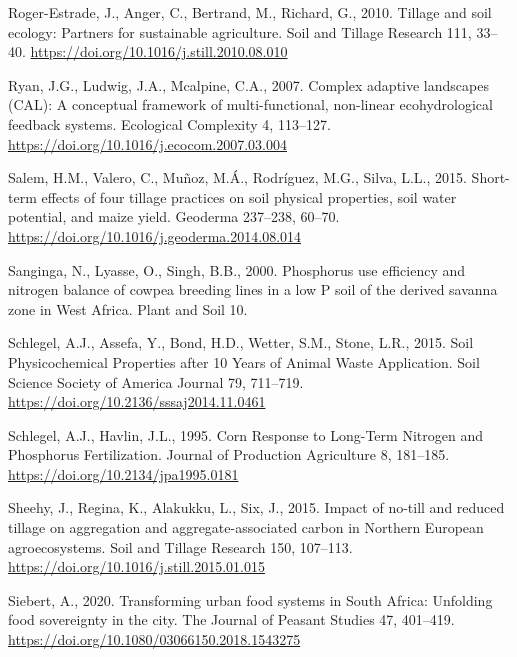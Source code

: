 \documentclass[
  12pt,
]{article}
\newlength{\cslhangindent}
\newlength{\cslentryspacingunit} %
\newenvironment{CSLReferences}[2] %
 {%
  \setlength{\parindent}{0pt}
  \ifodd #1
  \let\oldpar\par
  \def\par{\hangindent=\cslhangindent\oldpar}
  \fi
  \setlength{\parskip}{#2\cslentryspacingunit}
 }%
 {}
\begin{document}
\begin{CSLReferences}{1}{0}
\leavevmode{}%
Roger-Estrade, J., Anger, C., Bertrand, M., Richard, G., 2010. Tillage and soil ecology: {Partners} for sustainable agriculture. Soil and Tillage Research 111, 33--40. \url{https://doi.org/10.1016/j.still.2010.08.010}

\leavevmode{}%
Ryan, J.G., Ludwig, J.A., Mcalpine, C.A., 2007. Complex adaptive landscapes ({CAL}): {A} conceptual framework of multi-functional, non-linear ecohydrological feedback systems. Ecological Complexity 4, 113--127. \url{https://doi.org/10.1016/j.ecocom.2007.03.004}

\leavevmode{}%
Salem, H.M., Valero, C., Muñoz, M.Á., Rodríguez, M.G., Silva, L.L., 2015. Short-term effects of four tillage practices on soil physical properties, soil water potential, and maize yield. Geoderma 237--238, 60--70. \url{https://doi.org/10.1016/j.geoderma.2014.08.014}

\leavevmode{}%
Sanginga, N., Lyasse, O., Singh, B.B., 2000. Phosphorus use efficiency and nitrogen balance of cowpea breeding lines in a low {P} soil of the derived savanna zone in {West Africa}. Plant and Soil 10.

\leavevmode{}%
Schlegel, A.J., Assefa, Y., Bond, H.D., Wetter, S.M., Stone, L.R., 2015. Soil {Physicochemical Properties} after 10 {Years} of {Animal Waste Application}. Soil Science Society of America Journal 79, 711--719. \url{https://doi.org/10.2136/sssaj2014.11.0461}

\leavevmode{}%
Schlegel, A.J., Havlin, J.L., 1995. Corn {Response} to {Long-Term Nitrogen} and {Phosphorus Fertilization}. Journal of Production Agriculture 8, 181--185. \url{https://doi.org/10.2134/jpa1995.0181}

\leavevmode{}%
Sheehy, J., Regina, K., Alakukku, L., Six, J., 2015. Impact of no-till and reduced tillage on aggregation and aggregate-associated carbon in {Northern European} agroecosystems. Soil and Tillage Research 150, 107--113. \url{https://doi.org/10.1016/j.still.2015.01.015}

\leavevmode{}%
Siebert, A., 2020. Transforming urban food systems in {South Africa}: Unfolding food sovereignty in the city. The Journal of Peasant Studies 47, 401--419. \url{https://doi.org/10.1080/03066150.2018.1543275}


\end{CSLReferences}
\end{document}
